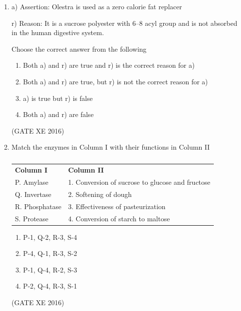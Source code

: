 \documentclass[12pt]{article}
\begin{document}
\begin{enumerate}
(GATE XE 2016)

\item a) Assertion: Olestra is used as a zero calorie fat replacer 

r) Reason: It is a sucrose polyester with 6--8 acyl group and is not absorbed in the human digestive system. 

Choose the correct answer from the following

\begin{enumerate}
\item Both a) and r) are true and r) is the correct reason for a)
\item Both a) and r) are true, but r) is not the correct reason for a)
\item a) is true but r) is false
\item Both a) and r) are false
\end{enumerate}

(GATE XE 2016)

\item Match the enzymes in Column I with their functions in Column II \\
\begin{table}[h]
\centering
\begin{tabular}{ll}
\textbf{Column I} & \textbf{Column II} \\
P. Amylase & 1. Conversion of sucrose to glucose and fructose \\
Q. Invertase & 2. Softening of dough \\
R. Phosphatase & 3. Effectiveness of pasteurization \\
S. Protease & 4. Conversion of starch to maltose \\
\end{tabular}
\caption{}
\label{}
\end{table}
\begin{multicols}{2}
\begin{enumerate}
\item P-1, Q-2, R-3, S-4
\item P-4, Q-1, R-3, S-2
\item P-1, Q-4, R-2, S-3
\item P-2, Q-4, R-3, S-1
\end{enumerate}
\end{multicols}
(GATE XE 2016)


\end{enumerate}
\end{document}
